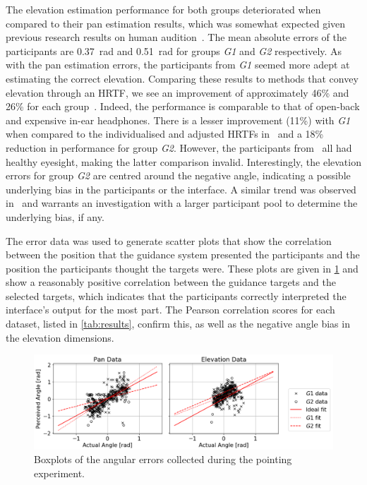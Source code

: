 \documentclass{llncs}
\begin{document}
The elevation estimation performance for both groups deteriorated when compared to their pan estimation results, which was somewhat expected given previous research results on human audition~\cite{barfield1997visual}. 
The mean absolute errors of the participants are \SI{0.37}{\radian} and \SI{0.51}{\radian} for groups \textit{G1} and \textit{G2} respectively.
As with the pan estimation errors, the participants from \textit{G1} seemed more adept at estimating the correct elevation.
Comparing these results to methods that convey elevation through an HRTF, we see an improvement of approximately 46\% and 26\% for each group~\cite{schonstein2008comparison}. 
Indeed, the performance is comparable to that of open-back and expensive in-ear headphones.
There is a lesser improvement (11\%) with \textit{G1} when compared to the individualised and adjusted HRTFs in~\cite{stanley2006lateralization} and a 18\% reduction in performance for group \textit{G2}.
However, the participants from~\cite{stanley2006lateralization} all had healthy eyesight, making the latter comparison invalid. 
Interestingly, the elevation errors for group \textit{G2} are centred around the negative angle, indicating a possible underlying bias in the participants or the interface.
A similar trend was observed in~\cite{stanley2006lateralization} and warrants an investigation with a larger participant pool to determine the underlying bias, if any. 

The error data was used to generate scatter plots that show the correlation between the position that the guidance system presented the participants and the position the participants thought the targets were.
These plots are given in \cref{fig:correlation-results} and show a reasonably positive correlation between the guidance targets and the selected targets, which indicates that the participants correctly interpreted the interface's output for the most part. 
The Pearson correlation scores for each dataset, listed in \cref{tab:results}, confirm this, as well as the negative angle bias in the elevation dimensions.

\begin{figure}[t]
  \centering
  \includegraphics[width=1.0\columnwidth]{figures/correlation.png}
  \caption{Boxplots of the angular errors collected during the pointing experiment. }\label{fig:correlation-results}
\end{figure}
\end{document}
